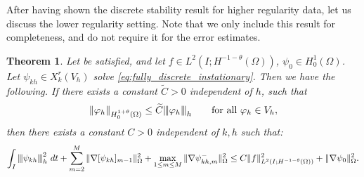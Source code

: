 \documentclass{m2an}
\newcommand{\1}{\mathds{1}}
\newcommand{\Om}{\Omega}
\newcommand{\psikh}{\psi_{kh}}
\newcommand{\na}{\nabla}
\newcommand{\vertiii}[1]{{\left\vert\kern-0.25ex\left\vert\kern-0.25ex\left\vert #1
    \right\vert\kern-0.25ex\right\vert\kern-0.25ex\right\vert}}
\newtheorem{theorem}{Theorem}[section]
\theoremstyle{definition}
\newcommand{\Cref}[1]{\zcref{#1}}
\begin{document}
After having shown the discrete stability result for higher regularity data, let us discuss 
  the lower regularity setting. Note that we only include this result for completeness, and do not 
  require it for the error estimates.
  \begin{theorem}\label{thm:stability_low_regularity}
    Let \Cref{ass:Vh_contained} be satisfied, and let
    $f\in L^2(I;H^{-1-\theta}(\Om))$, $\psi_0 \in H^1_0(\Om)$.
  Let $\psi_{kh} \in X^r_k(V_h)$ solve \eqref{eq:fully_discrete_instationary}. Then we have the following.
  If there exists a constant $\widetilde C>0$ independent of $h$, such that 
  \begin{equation}\label{eq:ass_stat_stab}
    \|\varphi_h\|_{H^{1+\theta}_0(\Om)} \le \widetilde C \vertiii{\varphi_h}_h \qquad \text{for all } \varphi_h \in V_h,
  \end{equation}
  then there exists a constant $C>0$ independent of $k,h$ such that:
  \begin{equation*}
    \int_I \vertiii{\psikh}^2_h \ dt + \sum_{m=2}^M \|\na [\psi_{kh}]_{m-1}\|_\Om^2 
    +  \max_{1\le m \le M} \|\na \psi_{kh,m}^-\|_\Om^2
    \le C \|f\|_{L^2(I;H^{-1-\theta}(\Om))}^2 + \|\na \psi_0\|_\Om^2 .
  \end{equation*}
\end{theorem}
\end{document}
